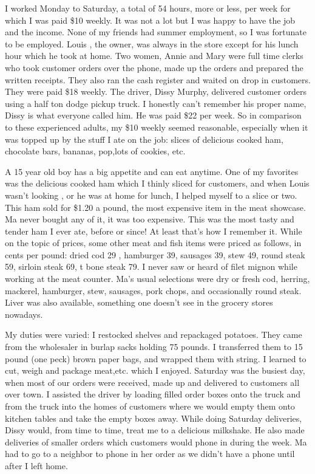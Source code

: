 I worked Monday to Saturday, a total of 54 hours, more or less, per week for which I was paid \$10 weekly. It was not a lot but I was happy to have the job and the income. None of my friends had summer employment, so I was fortunate to be employed. Louis , the owner, was always in the store except for his lunch hour which he took at home. Two women, Annie and Mary were full time clerks who took customer orders over the phone, made up the orders and prepared the written receipts. They also ran the cash register and waited on drop in customers. They were paid \$18 weekly. The driver, Dissy Murphy, delivered customer orders using a half ton dodge pickup truck. I honestly can't remember his proper name, Dissy is what everyone called him. He was paid \$22 per week. So in comparison to these experienced adults, my \$10 weekly seemed reasonable, especially when it was topped up by the stuff I ate on the job: slices of delicious cooked ham, chocolate bars, bananas, pop,lots of cookies, etc.

A 15 year old boy has a big appetite and can eat anytime. One of my favorites was the delicious cooked ham which I thinly sliced for customers, and when Louis wasn't looking , or he was at home for lunch, I helped myself to a slice or two. This ham sold for \$1.20 a pound, the most expensive item in the meat showcase. Ma never bought any of it, it was too expensive. This was the most tasty and tender ham I ever ate, before or since! At least that's how I remember it. While on the topic of prices, some other meat and fish items were priced as follows, in cents per pound: dried cod 29 , hamburger 39, sausages 39, stew 49, round steak 59, sirloin steak 69, t bone steak 79. I never saw or heard of filet mignon while working at the meat counter. Ma's usual selections were dry or fresh cod, herring, mackerel, hamburger, stew, sausages, pork chops, and occasionally round steak. Liver was also available, something one doesn't see in the grocery stores nowadays.

My duties were varied: I restocked shelves and repackaged potatoes. They came from the wholesaler in burlap sacks holding 75 pounds. I transferred them to 15 pound (one peck) brown paper bags, and wrapped them with string. I learned to cut, weigh and package meat,etc. which I enjoyed. Saturday was the busiest day, when most of our orders were received, made up and delivered to customers all over town. I assisted the driver by loading filled order boxes onto the truck and from the truck into the homes of customers where we would empty them onto kitchen tables and take the empty boxes away. While doing Saturday deliveries, Dissy would, from time to time, treat me to a delicious milkshake. He also made deliveries of smaller orders which customers would phone in during the week. Ma had to go to a neighbor to phone in her order as we didn't have a phone until after I left home.

